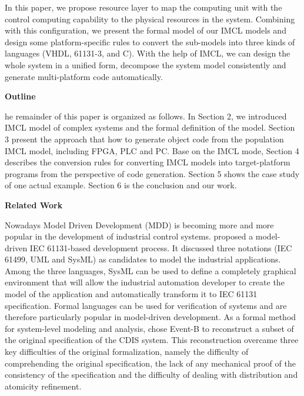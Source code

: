 In this paper, we propose resource layer to map the computing unit with the control computing capability to the physical resources in the system. Combining with this configuration, we present the formal model of our IMCL models and design some platform-specific rules to convert the sub-models into three kinds of languages (VHDL\cite{chu2011fpga}, 61131-3\cite{john2010iec}, and C). With the help of IMCL, we can design the whole system in a unified form, decompose the system model consistently and generate multi-platform code automatically.

\medskip
\textbf{Outline}
\medskip


he remainder of this paper is organized as follows.
In Section 2, we introduced IMCL model of complex systems and the formal definition of the model.
Section 3 present the approach that how to generate object code from the population IMCL model, including FPGA, PLC and PC.
Base on the IMCL mode, Section 4 describes the conversion rules for converting IMCL models into target-platform programs from the perspective of code generation.
Section 5 shows the case study of one actual example.
Section 6 is the conclusion and our work.

\medskip
\textbf{Related Work}
\medskip

Nowadays Model Driven Development (MDD) is becoming more and more popular in the development of industrial control systems.  \cite{thramboulidis2011towards} proposed a model-driven IEC 61131-based development process. It discussed three notations (IEC 61499, UML and SysML) as candidates to model the industrial applications. Among the three languages, SysML can be used to define a completely graphical environment that will allow the industrial automation developer to create the model of the application and automatically transform it to IEC 61131 specification. Formal languages can be used for verification of systems and are therefore particularly popular in model-driven development. As a formal method for system-level modeling and analysis, \cite{rezazadeh2007redevelopment} chose Event-B to reconstruct a subset of the original specification of the CDIS system. This reconstruction overcame three key difficulties of the original formalization, namely the difficulty of comprehending the original specification, the lack of any mechanical proof of the consistency of the specification and the difficulty of dealing with distribution and atomicity refinement.

